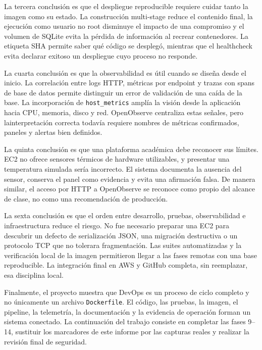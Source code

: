 \documentclass[12pt,a4paper]{article}
\begin{document}
La tercera conclusión es que el despliegue reproducible requiere cuidar tanto la imagen como su estado. La construcción multi-stage reduce el contenido final, la ejecución como usuario no root disminuye el impacto de una compromiso y el volumen de SQLite evita la pérdida de información al recrear contenedores. La etiqueta SHA permite saber qué código se desplegó, mientras que el healthcheck evita declarar exitoso un despliegue cuyo proceso no responde.

La cuarta conclusión es que la observabilidad es útil cuando se diseña desde el inicio. La correlación entre logs HTTP, métricas por endpoint y trazas con spans de base de datos permite distinguir un error de validación de una caída de la base. La incorporación de \texttt{host\_metrics} amplía la visión desde la aplicación hacia CPU, memoria, disco y red. OpenObserve centraliza estas señales, pero lainterpretación correcta todavía requiere nombres de métricas confirmados, paneles y alertas bien definidos.

La quinta conclusión es que una plataforma académica debe reconocer sus límites. EC2 no ofrece sensores térmicos de hardware utilizables, y presentar una temperatura simulada sería incorrecto. El sistema documenta la ausencia del sensor, conserva el panel como evidencia y evita una afirmación falsa. De manera similar, el acceso por HTTP a OpenObserve se reconoce como propio del alcance de clase, no como una recomendación de producción.

La sexta conclusión es que el orden entre desarrollo, pruebas, observabilidad e infraestructura reduce el riesgo. No fue necesario preparar una EC2 para descubrir un defecto de serialización JSON, una migración destructiva o un protocolo TCP que no tolerara fragmentación. Las suites automatizadas y la verificación local de la imagen permitieron llegar a las fases remotas con una base reproducible. La integración final en AWS y GitHub completa, sin reemplazar, esa disciplina local.

Finalmente, el proyecto muestra que DevOps es un proceso de ciclo completo y no únicamente un archivo \texttt{Dockerfile}. El código, las pruebas, la imagen, el pipeline, la telemetría, la documentación y la evidencia de operación forman un sistema conectado. La continuación del trabajo consiste en completar las fases 9--14, sustituir los marcadores de este informe por las capturas reales y realizar la revisión final de seguridad.

\end{document}

